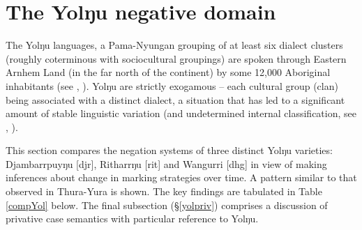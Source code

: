 \documentclass[usenames,dvipsnames,11pt]{article}
\begin{document}
{{\section{The Yolŋu negative domain}\label{yolŋu}

The Yolŋu languages, a Pama-Nyungan grouping of at least six dialect clusters (roughly coterminous with sociocultural groupings) are spoken through Eastern Arnhem Land (in the far north of the continent) by some 12,000 Aboriginal inhabitants (see \citealt[18\textit{ff}]{Wilkinson1991}, \citealt{Bowern2009}). Yolŋu are strictly exogamous -- each cultural group (clan) being associated with a distinct dialect, a situation that has led to a significant amount of stable linguistic variation (and undetermined internal classification, see \citealt{Schebeck2001}, \citealt[836]{Bowern2012b}).

This section compares the negation systems of three distinct Yolŋu varieties: Djambarrpuyŋu [\gls{djr}], Ritharrŋu [\gls{rit}] and Wangurri [\gls{dhg}] in view of making inferences about change in marking strategies over time. A pattern similar to that observed in Thura-Yura is shown. The key findings are tabulated in Table \ref{compYol} below. The final subsection (§\ref{yolpriv}) comprises a discussion of privative case semantics with particular reference to Yolŋu.

}}
\end{document}
